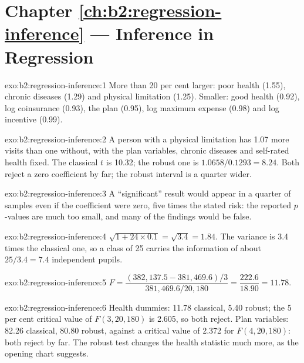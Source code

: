 \section*{Chapter \ref{ch:b2:regression-inference} --- Inference in Regression}

\begin{solution}{exo:b2:regression-inference:1}
More than 20 per cent larger: poor health (1.55), chronic diseases (1.29) and physical limitation (1.25). Smaller: good
health (0.92), log coinsurance (0.93), the  plan (0.95), log maximum expense (0.98) and log incentive (0.99).
\end{solution}

\begin{solution}{exo:b2:regression-inference:2}
A person with a physical limitation has 1.07 more visits than one without, with the plan variables, chronic diseases and
self-rated health fixed. The classical $t$ is 10.32; the robust one is $1.0658/0.1293 = 8.24$. Both reject a zero
coefficient by far; the robust interval is a quarter wider.
\end{solution}

\begin{solution}{exo:b2:regression-inference:3}
A ``significant'' result would appear in a quarter of samples even if the coefficient were zero, five times the stated
risk: the reported $p$-values are much too small, and many of the findings would be false.
\end{solution}

\begin{solution}{exo:b2:regression-inference:4}
$\sqrt{1 + 24 \times 0.1} = \sqrt{3.4} = 1.84$. The variance is 3.4 times the classical one, so a class of 25 carries the
information of about $25/3.4 = 7.4$ independent pupils.
\end{solution}

\begin{solution}{exo:b2:regression-inference:5}
$F = \dfrac{(382{,}137.5 - 381{,}469.6)/3}{381{,}469.6/20{,}180} = \dfrac{222.6}{18.90} = 11.78$.
\end{solution}

\begin{solution}{exo:b2:regression-inference:6}
Health dummies: 11.78 classical, 5.40 robust; the 5 per cent critical value of $F(3, 20{,}180)$ is 2.605, so both reject.
Plan variables: 82.26 classical, 80.80 robust, against a critical value of 2.372 for $F(4, 20{,}180)$: both reject by far.
The robust test changes the health statistic much more, as the opening chart suggests.
\end{solution}


